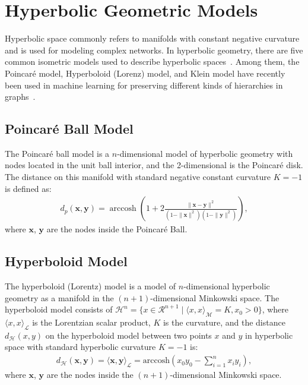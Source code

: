 \section{Hyperbolic Geometric Models}
Hyperbolic space commonly refers to manifolds with constant negative curvature and is used for modeling complex networks.
In hyperbolic geometry, there are five common isometric models used to describe hyperbolic spaces~\cite{cannon1997hyperbolic}. 
Among them, the Poincaré model, Hyperboloid (Lorenz) model, and Klein model have recently been used in machine learning for preserving different kinds of hierarchies in graphs~\cite{NickelK17Poincare,PoincareGlove,HNN:GaneaBH18,HGNN_Qi,HAtt}. 

\subsection{Poincaré Ball Model}
The Poincaré ball model is a $n$-dimensional model of hyperbolic geometry with nodes located in the unit ball interior, and the 2-dimensional is the Poincaré disk. 
The distance on this manifold with standard negative constant curvature $K=-1$ is defined as: 
\begin{equation}\label{equ:1}
\begin{aligned}
d_{p}(\mathbf{x}, \mathbf{y})=\operatorname{arccosh}\left(1+2 \frac{\|\mathbf{x}-\mathbf{y}\|^{2}}{\left(1-\|\mathbf{x}\|^{2}\right)\left(1-\|\mathbf{y}\|^{2}\right)}\right), 
\end{aligned}
\end{equation}
where $\mathbf{x}$, $\mathbf{y}$ are the nodes inside the Poincaré Ball. 

\subsection{Hyperboloid Model}
The hyperboloid (Lorentz) model is a model of $n$-dimensional hyperbolic geometry as a manifold in the $(n+1)$-dimensional Minkowski space. 
The hyperboloid model consists of $\mathcal{H}^n= \{ x\in \mathcal{R}^{n+1} \mid  \langle x,x \rangle_{\mathcal{M}} = K, x_{0}>0 \}$, where $\langle x,x \rangle_\mathcal{L}$ is the Lorentzian scalar product, $K$ is the curvature, and the distance $d_{\mathcal{H}}(x,y)$ on the hyperboloid model between two points $x$ and $y$ in hyperbolic space with standard hyperbolic curvature $K=-1$ is: 
\begin{equation}
\label{equ:2}
\begin{aligned}
     d_{\mathcal{H}}(\mathbf{x},\mathbf{y})= \langle \mathbf{x},\mathbf{y} \rangle_{\mathcal{L}} = \mathrm{arccosh}({x_0 y_0} - \sum_{i=1}^{n}{x_i y_i}), 
\end{aligned}
\end{equation}
where  $\mathbf{x}$, $\mathbf{y}$ are the nodes inside the $(n+1)$-dimensional Minkowski space. 


